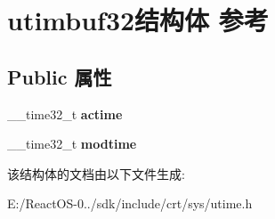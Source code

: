 \hypertarget{structutimbuf32}{}\section{utimbuf32结构体 参考}
\label{structutimbuf32}
\subsection*{Public 属性}
\begin{DoxyCompactItemize}
\item 
\mbox{\label{structutimbuf32_a745a60fa0b42ec8e47c010fc3c71b76e}} 
\+\_\+\+\_\+time32\+\_\+t {\bfseries actime}
\item 
\mbox{\label{structutimbuf32_a468a1483b7fded9edce0201567acdb7f}} 
\+\_\+\+\_\+time32\+\_\+t {\bfseries modtime}
\end{DoxyCompactItemize}


该结构体的文档由以下文件生成\+:\begin{DoxyCompactItemize}
\item 
E\+:/\+React\+O\+S-\/0../sdk/include/crt/sys/utime.\+h\end{DoxyCompactItemize}
